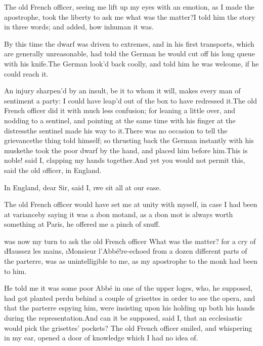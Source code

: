 \documentclass[twoside]{article}
\begin{document}
The old French officer, seeing me lift up my eyes with an emotion, as I
made the apostrophe, took the liberty to ask me what was the matter?\tsk I
told him the story in three words; and added, how inhuman it was.

By this time the dwarf was driven to extremes, and in his first
transports, which are generally unreasonable, had told the German he
would cut off his long queue with his knife.\tsk The German look’d back
coolly, and told him he was welcome, if he could reach it.

An injury sharpen’d by an insult, be it to whom it will, makes every man
of sentiment a party: I could have leap’d out of the box to have
redressed it.\tsk The old French officer did it with much less confusion; for
leaning a little over, and nodding to a sentinel, and pointing at the
same time with his finger at the distress\tsk the sentinel made his way to
it.\tsk There was no occasion to tell the grievance\tsk the thing told himself;
so thrusting back the German instantly with his musket\tsk he took the poor
dwarf by the hand, and placed him before him.\tsk This is noble! said I,
clapping my hands together.\tsk And yet you would not permit this, said the
old officer, in England.

\tsk In England, dear Sir, said I, \i{we sit all at our ease}.

The old French officer would have set me at unity with myself, in case I
had been at variance\tsk by saying it was a \i{bon mot}\tsk and, as a \i{bon mot}
is always worth something at Paris, he offered me a pinch of snuff.






 was now my turn to ask the old French officer \lqq What was the matter?\rqq
for a cry of \lqq \i{Haussez les mains}, \i{Monsieur l’Abbé!}\rqq re-echoed from a
dozen different parts of the parterre, was as unintelligible to me, as my
apostrophe to the monk had been to him.

He told me it was some poor Abbé in one of the upper loges, who, he
supposed, had got planted perdu behind a couple of grisettes in order to
see the opera, and that the parterre espying him, were insisting upon his
holding up both his hands during the representation.\tsk And can it be
supposed, said I, that an ecclesiastic would pick the grisettes’ pockets?
The old French officer smiled, and whispering in my ear, opened a door of
knowledge which I had no idea of.
\end{document}
